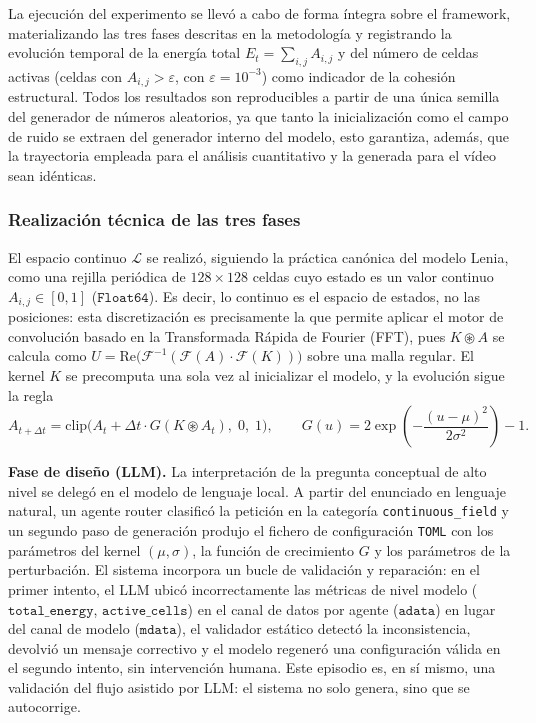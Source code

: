 \documentclass[runningheads]{llncs}
\begin{document}
La ejecución del experimento se llevó a cabo de forma íntegra sobre el framework, materializando las tres fases descritas en la metodología y registrando la evolución temporal de la energía total $E_t = \sum_{i,j} A_{i,j}$ y del número de celdas activas (celdas con $A_{i,j} > \varepsilon$, con $\varepsilon = 10^{-3}$) como indicador de la cohesión estructural. Todos los resultados son reproducibles a partir de una única semilla del generador de números aleatorios, ya que tanto la inicialización como el campo de ruido se extraen del generador interno del modelo, esto garantiza, además, que la trayectoria empleada para el análisis cuantitativo y la generada para el vídeo sean idénticas.

\subsubsection{Realización técnica de las tres fases}

El espacio continuo $\mathcal{L}$ se realizó, siguiendo la práctica canónica del modelo Lenia, como una rejilla periódica de $128 \times 128$ celdas cuyo estado es un valor continuo $A_{i,j} \in [0,1]$ ($\mathtt{Float64}$). Es decir, lo continuo es el espacio de estados, no las posiciones: esta discretización es precisamente la que permite aplicar el motor de convolución basado en la Transformada Rápida de Fourier (FFT), pues $K \circledast A$
se calcula como $U = \mathrm{Re}\big(\mathcal{F}^{-1}(\mathcal{F}(A)\cdot \mathcal{F}(K))\big)$ sobre una malla regular. El kernel $K$ se precomputa una sola vez al inicializar el modelo, y la evolución sigue la regla
\[
    A_{t+\Delta t} = \mathrm{clip}\big(A_t + \Delta t \cdot G(K \circledast A_t),\; 0,\; 1\big),
    \qquad
    G(u) = 2\exp\!\left(-\frac{(u-\mu)^2}{2\sigma^2}\right) - 1 .
\]

\textbf{Fase de diseño (LLM).} La interpretación de la pregunta conceptual de alto nivel se delegó en el modelo de lenguaje local. A partir del enunciado en lenguaje natural, un agente router clasificó la petición en la categoría \texttt{continuous\_field} y un segundo paso de generación produjo el fichero de configuración \texttt{TOML} con los parámetros del kernel $(\mu, \sigma)$, la función de crecimiento $G$ y los
parámetros de la perturbación. El sistema incorpora un bucle de validación y reparación: en el primer intento, el LLM ubicó incorrectamente las métricas de nivel modelo
($\texttt{total\_energy}$, $\texttt{active\_cells}$) en el canal de datos por agente
($\texttt{adata}$) en lugar del canal de modelo ($\texttt{mdata}$), el validador estático
detectó la inconsistencia, devolvió un mensaje correctivo y el modelo regeneró una
configuración válida en el segundo intento, sin intervención humana. Este episodio es, en sí
mismo, una validación del flujo asistido por LLM: el sistema no solo genera, sino que se autocorrige.\\
\end{document}
